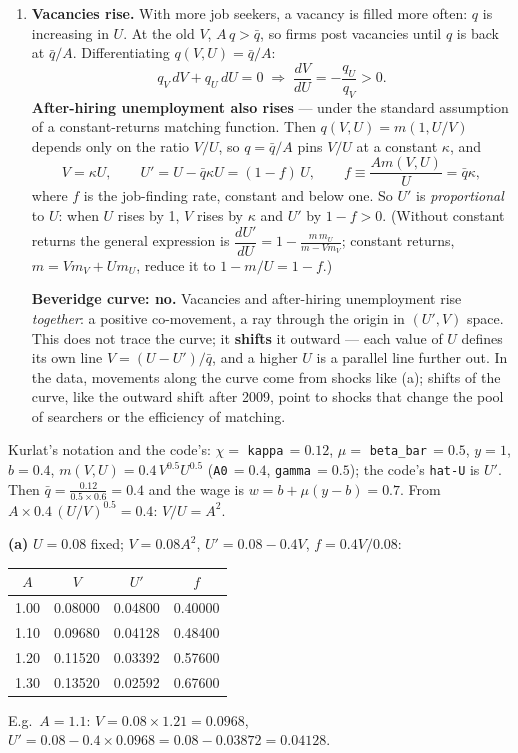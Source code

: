 \documentclass[12pt, letterpaper]{article}
\newcommand{\dd}[2]{\dfrac{d #1}{d #2}}
\begin{document}
\begin{tcolorbox}[oddbox,title={Problem 7.7 \quad The Beveridge Curve}]
\begin{enumerate}
\item \textbf{Vacancies rise.} With more job seekers, a vacancy is filled more often: $q$ is
increasing in $U$. At the old $V$, $A\,q>\bar q$, so firms post vacancies until $q$ is back at
$\bar q/A$. Differentiating $q(V,U)=\bar q/A$:
\[
q_V\,dV+q_U\,dU=0\;\Longrightarrow\;\dd{V}{U}=-\frac{q_U}{q_V}>0 .
\]
\textbf{After-hiring unemployment also rises} --- under the standard assumption of a
constant-returns matching function. Then $q(V,U)=m(1,U/V)$ depends only on the ratio $V/U$,
so $q=\bar q/A$ pins $V/U$ at a constant $\kappa$, and
\[
V=\kappa U,\qquad U'=U-\bar q\kappa U=(1-f)\,U,
\qquad f\equiv\frac{Am(V,U)}{U}=\bar q\kappa ,
\]
where $f$ is the job-finding rate, constant and below one. So $U'$ is \emph{proportional} to
$U$: when $U$ rises by 1, $V$ rises by $\kappa$ and $U'$ by $1-f>0$. (Without constant returns
the general expression is $\dd{U'}{U}=1-\frac{m\,m_U}{m-Vm_V}$; constant returns,
$m=Vm_V+Um_U$, reduce it to $1-m/U=1-f$.)

\textbf{Beveridge curve: no.} Vacancies and after-hiring unemployment rise
\emph{together}: a positive co-movement, a ray through the origin in $(U',V)$ space. This does
not trace the curve; it \textbf{shifts} it outward --- each value of $U$ defines its own line
$V=(U-U')/\bar q$, and a higher $U$ is a parallel line further out. In the data, movements
along the curve come from shocks like (a); shifts of the curve, like the outward shift after
2009, point to shocks that change the pool of searchers or the efficiency of matching.
\end{enumerate}

\begin{tcolorbox}[databox]
Kurlat's notation and the code's: $\chi=$ \texttt{kappa}$\,=0.12$, $\mu=$
\texttt{beta\_bar}$\,=0.5$, $y=1$, $b=0.4$, $m(V,U)=0.4\,V^{0.5}U^{0.5}$ (\texttt{A0}$\,=0.4$,
\texttt{gamma}$\,=0.5$); the code's \texttt{hat-U} is $U'$. Then
$\bar q=\frac{0.12}{0.5\times0.6}=0.4$ and the wage is $w=b+\mu(y-b)=0.7$. From
$A\times0.4\,(U/V)^{0.5}=0.4$: $V/U=A^{2}$.

\smallskip
\textbf{(a)} $U=0.08$ fixed; $V=0.08A^{2}$, $U'=0.08-0.4V$, $f=0.4V/0.08$:
\begin{center}
\begin{tabular}{@{}cccc@{}}
\toprule
$A$ & $V$ & $U'$ & $f$\\
\midrule
1.00 & 0.08000 & 0.04800 & 0.40000\\
1.10 & 0.09680 & 0.04128 & 0.48400\\
1.20 & 0.11520 & 0.03392 & 0.57600\\
1.30 & 0.13520 & 0.02592 & 0.67600\\
\bottomrule
\end{tabular}
\end{center}
E.g.\ $A=1.1$: $V=0.08\times1.21=0.0968$, $U'=0.08-0.4\times0.0968=0.08-0.03872=0.04128$.


\end{tcolorbox}
\end{tcolorbox}
\end{document}
